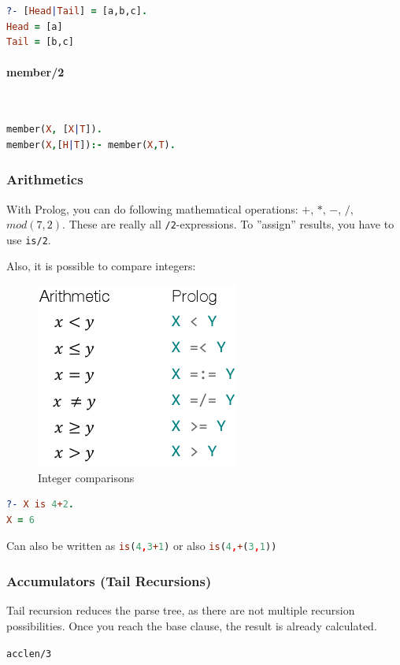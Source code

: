 \begin{lstlisting}[language=Prolog]
?- [Head|Tail] = [a,b,c].
Head = [a]
Tail = [b,c]
\end{lstlisting}


\paragraph{member/2} \hfill \\

\begin{lstlisting}[language=Prolog]
member(X, [X|T]).
member(X,[H|T]):- member(X,T).
\end{lstlisting}

\subsubsection{Arithmetics}

With Prolog, you can do following mathematical operations: $+$, $*$, $-$, $/$, $mod(7,2)$. These are really all \lstinline|/2|-expressions. To ''assign'' results, you have to use \lstinline|is/2|.

Also, it is possible to compare integers:
\begin{figure}[h]
\centering
\includegraphics[width=0.2\linewidth]{images/integer_comparison}
\caption{Integer comparisons}
\label{fig:integercomparison}
\end{figure}


\begin{lstlisting}[language=Prolog]
?- X is 4+2.
X = 6
\end{lstlisting}

Can also be written as \lstinline[language=Prolog]|is(4,3+1)| or also \lstinline[language=Prolog]|is(4,+(3,1))|

\subsubsection{Accumulators (Tail Recursions)}

Tail recursion reduces the parse tree, as there are not multiple recursion possibilities. Once you reach the base clause, the result is already calculated.

\lstinline|acclen/3|

